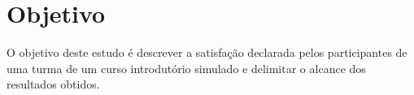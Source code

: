 \section{Objetivo}
O objetivo deste estudo é descrever a satisfação declarada pelos participantes de uma turma de um curso introdutório simulado e delimitar o alcance dos resultados obtidos.
